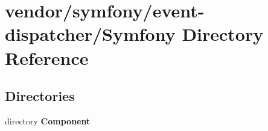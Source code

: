 \section{vendor/symfony/event-\/dispatcher/\+Symfony Directory Reference}
\label{dir_f6e63dddca1abd9b8ec1926ca83173ec}
\subsection*{Directories}
\begin{DoxyCompactItemize}
\item 
directory {\bf Component}
\end{DoxyCompactItemize}
